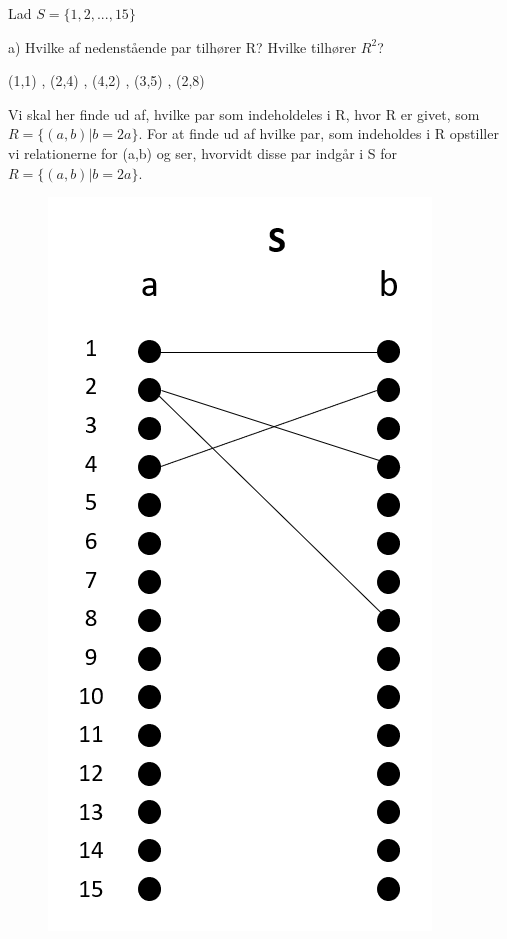 \documentclass{article}
\begin{document}
Lad $S = \{1,2,...,15\}$


a) Hvilke af nedenstående par tilhører R? Hvilke tilhører $R^2$?

\begin{center}
     (1,1) , (2,4) , (4,2) , (3,5) , (2,8)
\end{center}

Vi skal her finde ud af, hvilke par som indeholdeles i R, hvor R er givet, som $R = \{ (a,b)  |  b = 2a\}$.
For at finde ud af hvilke par, som indeholdes i R opstiller vi relationerne for (a,b) og ser, hvorvidt disse par indgår i S for $R = \{ (a,b)  |  b = 2a\}$.


\begin{figure}[h]
\begin{center}
\includegraphics[scale=0.9]{ABC1}
\end{center}
\end{figure}
\end{document}
